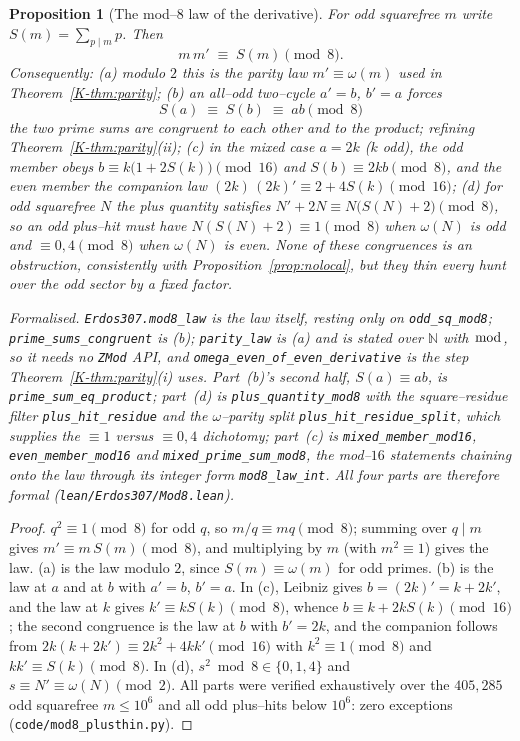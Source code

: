 \documentclass[11pt]{article}
\newtheorem{proposition}[theorem]{Proposition}
\theoremstyle{definition}
\newcommand{\NN}{\mathbb{N}}
\begin{document}
\begin{proposition}[The mod--$8$ law of the derivative]\label{prop:mod8}
For odd squarefree $m$ write $S(m)=\sum_{p\mid m}p$. Then
\[ m\,m'\;\equiv\;S(m)\pmod 8. \]
Consequently: \textup{(a)} modulo $2$ this is the parity law $m'\equiv\omega(m)$ used in
Theorem~\ref{K-thm:parity}; \textup{(b)} an all--odd two--cycle $a'=b$, $b'=a$ forces
\[ S(a)\;\equiv\;S(b)\;\equiv\;ab\pmod 8 \]
the two prime sums are congruent to each other and to the product; refining
Theorem~\ref{K-thm:parity}(ii); \textup{(c)} in the mixed case $a=2k$ ($k$ odd), the odd member obeys
$b\equiv k\bigl(1+2S(k)\bigr)\pmod{16}$ and $S(b)\equiv2kb\pmod8$, and the even member the companion
law $(2k)\,(2k)'\equiv2+4S(k)\pmod{16}$; \textup{(d)} for odd squarefree $N$ the plus quantity
satisfies $N'+2N\equiv N\bigl(S(N)+2\bigr)\pmod8$, so an odd plus--hit must have
$N(S(N)+2)\equiv1\pmod8$ when $\omega(N)$ is odd and $\equiv0,4\pmod8$ when $\omega(N)$ is even.
None of these congruences is an obstruction, consistently with Proposition~\ref{prop:nolocal},
but they thin every hunt over the odd sector by a fixed factor.

\textup{Formalised.} \texttt{Erdos307.mod8\_law} is the law itself, resting only on
\texttt{odd\_sq\_mod8}; \texttt{prime\_sums\_congruent} is \textup{(b)}; \texttt{parity\_law} is
\textup{(a)} and is stated over $\NN$ with $\bmod$, so it needs no \texttt{ZMod} API, and
\texttt{omega\_even\_of\_even\_derivative} is the step Theorem~\ref{K-thm:parity}\textup{(i)} uses.
Part~\textup{(b)}'s second half, $S(a)\equiv ab$, is
\texttt{prime\_sum\_eq\_product}; part~\textup{(d)} is \texttt{plus\_quantity\_mod8} with the
square--residue filter \texttt{plus\_hit\_residue} and the $\omega$--parity split
\texttt{plus\_hit\_residue\_split}, which supplies the $\equiv1$ versus $\equiv0,4$ dichotomy;
part~\textup{(c)} is
\texttt{mixed\_member\_mod16}, \texttt{even\_member\_mod16} and \texttt{mixed\_prime\_sum\_mod8},
the mod--$16$ statements chaining onto the law through its integer form \texttt{mod8\_law\_int}. All
four parts are therefore formal \textup{(\texttt{lean/Erdos307/Mod8.lean})}.
\end{proposition}
\begin{proof}
$q^2\equiv1\pmod8$ for odd $q$, so $m/q\equiv mq\pmod8$; summing over $q\mid m$ gives
$m'\equiv m\,S(m)\pmod8$, and multiplying by $m$ (with $m^2\equiv1$) gives the law. (a) is the law
modulo $2$, since $S(m)\equiv\omega(m)$ for odd primes. (b) is the law at $a$ and at $b$ with $a'=b$,
$b'=a$. In (c), Leibniz gives $b=(2k)'=k+2k'$, and the law at $k$ gives $k'\equiv kS(k)\pmod8$,
whence $b\equiv k+2kS(k)\pmod{16}$; the second congruence is the law at $b$ with $b'=2k$, and the
companion follows from $2k(k+2k')\equiv2k^2+4kk'\pmod{16}$ with $k^2\equiv1\pmod8$ and
$kk'\equiv S(k)\pmod8$. In (d), $s^2\bmod8\in\{0,1,4\}$ and $s\equiv N'\equiv\omega(N)\pmod2$.
All parts were verified exhaustively over the $405{,}285$ odd squarefree $m\le10^6$ and all odd
plus--hits below $10^6$: zero exceptions (\texttt{code/mod8\_plusthin.py}).
\end{proof}
\end{document}
